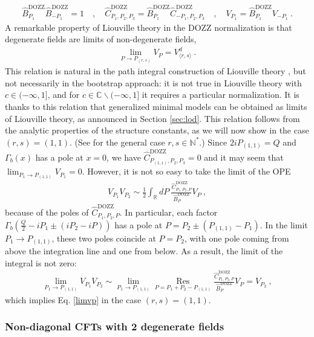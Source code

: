 \documentclass[12pt, a4paper]{article}
\theoremstyle{break}
\begin{document}
\begin{align}
 \hat B^\text{DOZZ}_{P_1}\hat B^\text{DOZZ}_{-P_1}=1 \quad , \quad  \hat C^\text{DOZZ}_{P_1,P_2,P_3} = \hat B^\text{DOZZ}_{P_1}\hat C^\text{DOZZ}_{-P_1,P_2,P_3} \quad , \quad V_{P_1} = \hat B^\text{DOZZ}_{P_1} V_{-P_1}\ . 
\end{align}
A remarkable property of Liouville theory in the DOZZ normalization is that degenerate fields are limits of non-degenerate fields,
\begin{align}
 \lim_{P\to P_{(r,s)}} V_P = V^d_{\langle r,s\rangle} \ .
 \label{limvp}
\end{align}
This relation is natural in the path integral construction of Liouville theory \cite{zz95}, but not necessarily in the bootstrap approach: it is not true in Liouville theory with $c\in (-\infty, 1]$, and for $c\in\mathbb{C}\backslash (-\infty,1]$ it requires a particular normalization. It is thanks to this relation that generalized minimal models can be obtained as limits of Liouville theory, as announced in Section \ref{sec:lod}. This relation follows from the analytic properties of the structure constants, as we will now show in the case $(r,s)=(1,1)$. (See \cite[Section 3.1.5]{rib14} for the general case $r,s\in\mathbb{N}^*$.) Since $2iP_{(1,1)}=Q$ and $\Gamma_b(x)$ has a pole at $x=0$, we have $\hat C^\text{DOZZ}_{P_{(1,1)},P_2,P_3} = 0$ and it may seem that $\lim_{P_1\to P_{(1,1)}} V_{P_1} = 0$. However, it is not so easy to take the limit of the OPE 
\begin{align}
V_{P_1}V_{P_2} \sim \frac12 \int_{\mathbb{R}}dP\ \frac{\hat C^\text{DOZZ}_{P_1,P_2,P}}{\hat B^\text{DOZZ}_{P}}V_P\ , 
\end{align}
because of the poles of $\hat C^\text{DOZZ}_{P_1,P_2,P}$. In particular, each factor $\Gamma_b(\frac{Q}{2}-iP_1\pm (iP_2-iP))$ has a pole at $P= P_2\pm (P_{(1,1)}-P_1)$. In the limit $P_1\to P_{(1,1)}$, these two poles coincide at $P=P_2$, with one pole coming from above the integration line and one from below. As a result, the limit of the integral is not zero: 
\begin{align}
 \lim_{P_1\to P_{(1,1)}}V_{P_1}V_{P_2} \sim \lim_{P_1\to P_{(1,1)}}  \underset{P=P_1+P_2-P_{(1,1)}}{\operatorname{Res}}\frac{\hat C^\text{DOZZ}_{P_1,P_2,P}}{\hat B^\text{DOZZ}_{P}}V_P=V_{P_2}\ ,
\end{align}
which implies Eq. \eqref{limvp} in the case $(r,s)=(1,1)$. 

\subsubsection{Non-diagonal CFTs with 2 degenerate fields}
\end{document}
